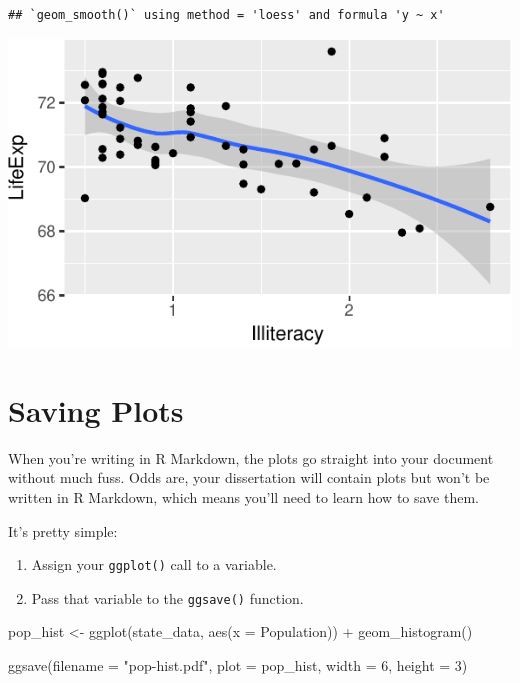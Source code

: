 \documentclass[
  12pt,
  oneside,openany]{book}
\newenvironment{Shaded}{\begin{snugshade}}{\end{snugshade}}
\newcommand{\AttributeTok}[1]{\textcolor[rgb]{0.77,0.63,0.00}{#1}}
\newcommand{\DecValTok}[1]{\textcolor[rgb]{0.00,0.00,0.81}{#1}}
\newcommand{\FunctionTok}[1]{\textcolor[rgb]{0.00,0.00,0.00}{#1}}
\newcommand{\NormalTok}[1]{#1}
\newcommand{\OtherTok}[1]{\textcolor[rgb]{0.56,0.35,0.01}{#1}}
\newcommand{\SpecialCharTok}[1]{\textcolor[rgb]{0.00,0.00,0.00}{#1}}
\newcommand{\StringTok}[1]{\textcolor[rgb]{0.31,0.60,0.02}{#1}}
\providecommand{\tightlist}{%
  \setlength{\itemsep}{0pt}\setlength{\parskip}{0pt}}
\begin{document}
\begin{verbatim}
## `geom_smooth()` using method = 'loess' and formula 'y ~ x'
\end{verbatim}

\includegraphics{pdaps_files/figure-latex/combine-1.pdf}

\hypertarget{saving-plots}{%
\section{Saving Plots}\label{saving-plots}}

When you're writing in R Markdown, the plots go straight into your document without much fuss. Odds are, your dissertation will contain plots but won't be written in R Markdown, which means you'll need to learn how to save them.

It's pretty simple:

\begin{enumerate}
\def\labelenumi{\arabic{enumi}.}
\tightlist
\item
  Assign your \texttt{ggplot()} call to a variable.
\item
  Pass that variable to the \texttt{ggsave()} function.
\end{enumerate}

\begin{Shaded}
\begin{Highlighting}[]
\NormalTok{pop\_hist }\OtherTok{\textless{}{-}} \FunctionTok{ggplot}\NormalTok{(state\_data, }\FunctionTok{aes}\NormalTok{(}\AttributeTok{x =}\NormalTok{ Population)) }\SpecialCharTok{+}
  \FunctionTok{geom\_histogram}\NormalTok{()}

\FunctionTok{ggsave}\NormalTok{(}\AttributeTok{filename =} \StringTok{"pop{-}hist.pdf"}\NormalTok{,}
       \AttributeTok{plot =}\NormalTok{ pop\_hist,}
       \AttributeTok{width =} \DecValTok{6}\NormalTok{,}
       \AttributeTok{height =} \DecValTok{3}\NormalTok{)}
\end{Highlighting}
\end{Shaded}
\end{document}
